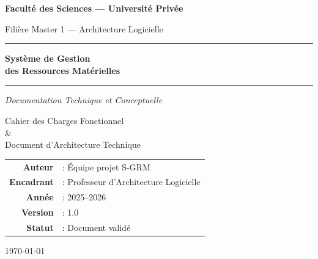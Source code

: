 \documentclass[a4paper,11pt,openany]{report}
\begin{document}
\begin{titlepage}
  \centering
  \vspace*{1.5cm}
  {\Large\bfseries Faculté des Sciences --- Université Privée \par}
  \vspace{0.4cm}
  {\large Filière Master 1 --- Architecture Logicielle\par}
  \vspace{2cm}

  \rule{\linewidth}{1pt}
  \vspace{0.4cm}
  {\Huge\bfseries\color{bleuFac}
    Système de Gestion \\[0.3cm] des Ressources Matérielles\par}
  \vspace{0.4cm}
  \rule{\linewidth}{1pt}

  \vspace{1.5cm}
  {\LARGE\itshape Documentation Technique et Conceptuelle\par}
  \vspace{0.5cm}
  {\Large Cahier des Charges Fonctionnel \\
          \& \\
          Document d'Architecture Technique\par}

  \vfill
  \begin{tabular}{rl}
    \textbf{Auteur}        & : Équipe projet S-GRM \\
    \textbf{Encadrant}     & : Professeur d'Architecture Logicielle \\
    \textbf{Année}         & : 2025--2026 \\
    \textbf{Version}       & : 1.0 \\
    \textbf{Statut}        & : Document validé \\
  \end{tabular}

  \vspace{1cm}
  {\large\today\par}
\end{titlepage}

\tableofcontents
\listoftables
\listoffigures

\end{document}
